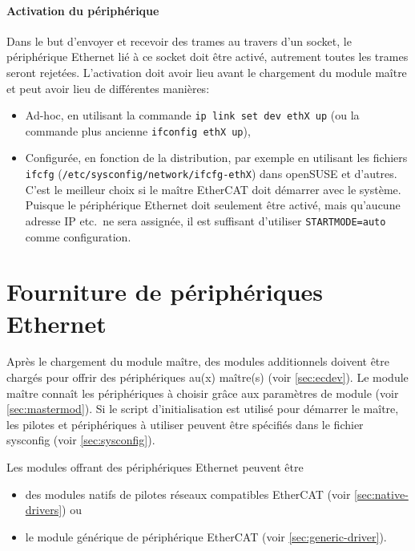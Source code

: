 \documentclass[a4paper,12pt,BCOR6mm,bibtotoc,idxtotoc]{scrbook}
\begin{document}
\paragraph{Activation du p\'eriph\'erique} Dans le but d'envoyer
et recevoir des trames au travers d'un socket, le p\'eriph\'erique
Ethernet li\'e \`a ce socket doit \^etre activ\'e, autrement toutes
les trames seront rejet\'ees.  L'activation doit avoir lieu avant le
chargement du module ma\^itre et peut avoir lieu de diff\'erentes
mani\`eres:

\begin{itemize}

\item Ad-hoc, en utilisant la commande
  \lstinline+ip link set dev ethX up+
  (ou la commande plus ancienne \lstinline+ifconfig ethX up+),

\item Configur\'ee, en fonction de la distribution, par exemple en
  utilisant les fichiers \lstinline+ifcfg+
  (\lstinline+/etc/sysconfig/network/ifcfg-ethX+) dans openSUSE et
  d'autres. C'est le meilleur choix si le ma\^itre EtherCAT doit
  d\'emarrer avec le syst\`eme. Puisque le p\'eriph\'erique Ethernet doit
  seulement \^etre activ\'e, mais qu'aucune adresse IP etc.\ ne sera
  assign\'ee, il est suffisant d'utiliser \lstinline+STARTMODE=auto+
  comme configuration.

\end{itemize}


\section{Fourniture de p\'eriph\'eriques Ethernet}
\label{sec:providing-devices}

Apr\`es le chargement du module ma\^itre, des modules additionnels
doivent \^etre charg\'es pour offrir des p\'eriph\'eriques au(x)
ma\^itre(s) (voir \autoref{sec:ecdev}). Le module ma\^itre conna\^it
les p\'eriph\'eriques \`a choisir gr\^ace aux param\`etres de module
(voir \autoref{sec:mastermod}). Si le script d'initialisation est
utilis\'e pour d\'emarrer le ma\^itre, les pilotes et
p\'eriph\'eriques \`a utiliser peuvent \^etre sp\'ecifi\'es dans le
fichier sysconfig (voir \autoref{sec:sysconfig}).

Les modules offrant des p\'eriph\'eriques Ethernet peuvent \^etre

\begin{itemize}
\item des modules natifs de pilotes r\'eseaux compatibles EtherCAT (voir
  \autoref{sec:native-drivers}) ou
\item le module g\'en\'erique de p\'eriph\'erique EtherCAT (voir
  \autoref{sec:generic-driver}).
\end{itemize}
\end{document}
